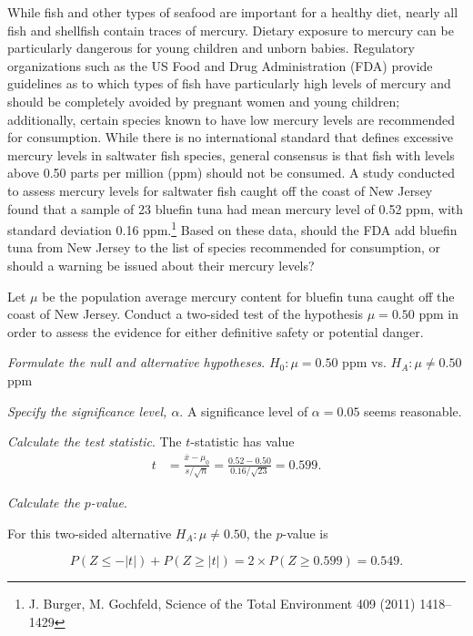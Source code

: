 \begin{example}
{While fish and other types of seafood are important for a healthy diet, nearly all fish and shellfish contain traces of mercury. Dietary exposure to mercury can be particularly dangerous for young children and unborn babies. Regulatory organizations such as the US Food and Drug Administration (FDA) provide guidelines as to which types of fish have particularly high levels of mercury and should be completely avoided by pregnant women and young children; additionally, certain species known to have low mercury levels are recommended for consumption. While there is no international standard that defines excessive mercury levels in saltwater fish species, general consensus is that fish with levels above 0.50 parts per million (ppm) should not be consumed. A study conducted to assess mercury levels for saltwater fish caught off the coast of New Jersey found that a sample of 23 bluefin tuna had mean mercury level of 0.52 ppm, with standard deviation 0.16 ppm.\footnote{J. Burger, M. Gochfeld, Science of the Total Environment 409 (2011) 1418–1429} Based on these data, should the FDA add bluefin tuna from New Jersey to the list of species recommended for consumption, or should a warning be issued about their mercury levels?}
\label{hypTestTuna}

Let $\mu$ be the population average mercury content for bluefin tuna caught off the coast of New Jersey. Conduct a two-sided test of the hypothesis $\mu = 0.50$ ppm in order to assess the evidence for either definitive safety or potential danger.

\textit{Formulate the null and alternative hypotheses}. $H_0: \mu = 0.50$ ppm vs. $H_A: \mu \neq 0.50$ ppm

\textit{Specify the significance level, $\alpha$}.  A significance level of $\alpha = 0.05$ seems reasonable. 

\textit{Calculate the test statistic}. The  $t$-statistic has value
\begin{align*}
t &= \frac{\overline{x}-\mu_0}{s/\sqrt{n}} = \frac{0.52 - 0.50} {0.16/\sqrt{23}} = 0.599.
\end{align*}

\textit{Calculate the $p$-value}.

For this two-sided alternative $H_A: \mu \neq 0.50$, the $p$-value is 

\[P(Z \leq -|t|) + P(Z \geq |t|) = 2 \times P(Z \geq 0.599) = 0.549.\]


\end{example}
